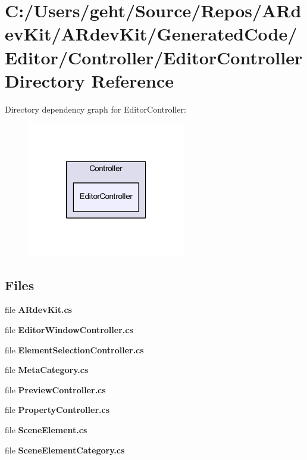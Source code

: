 \section{C\-:/\-Users/geht/\-Source/\-Repos/\-A\-Rdev\-Kit/\-A\-Rdev\-Kit/\-Generated\-Code/\-Editor/\-Controller/\-Editor\-Controller Directory Reference}
\label{dir_ec54693c279bbe6e3c54caf2ec1a5b83}
Directory dependency graph for Editor\-Controller\-:
\nopagebreak
\begin{figure}[H]
\begin{center}
\leavevmode
\includegraphics[width=196pt]{dir_ec54693c279bbe6e3c54caf2ec1a5b83_dep}
\end{center}
\end{figure}
\subsection*{Files}
\begin{DoxyCompactItemize}
\item 
file {\bfseries A\-Rdev\-Kit.\-cs}
\item 
file {\bfseries Editor\-Window\-Controller.\-cs}
\item 
file {\bfseries Element\-Selection\-Controller.\-cs}
\item 
file {\bfseries Meta\-Category.\-cs}
\item 
file {\bfseries Preview\-Controller.\-cs}
\item 
file {\bfseries Property\-Controller.\-cs}
\item 
file {\bfseries Scene\-Element.\-cs}
\item 
file {\bfseries Scene\-Element\-Category.\-cs}
\end{DoxyCompactItemize}
